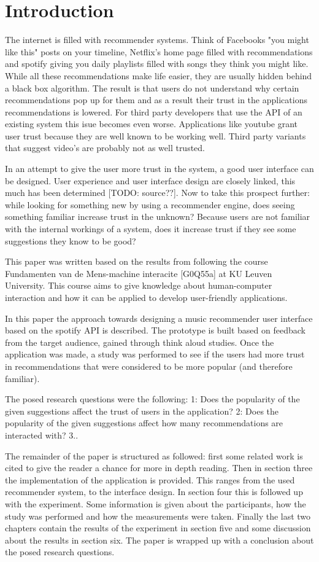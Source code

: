 \documentclass[sigconf,nonacm]{acmart}
\begin{document}
\section{Introduction}
The internet is filled with recommender systems. Think of Facebooks "you might like this" posts on your timeline, Netflix's home page filled with recommendations and spotify giving you daily playlists filled with songs they think you might like. While all these recommendations make life easier, they are usually hidden behind a black box algorithm. The result is that users do not understand why certain recommendations pop up for them and as a result their trust in the applications recommendations is lowered. For third party developers that use the API of an existing system this isue becomes even worse. Applications like youtube grant user trust because they are well known to be working well. Third party variants that suggest video's are probably not as well trusted.

In an attempt to give the user more trust in the system, a good user interface can be designed. User experience and user interface design are closely linked, this much has been determined [TODO: source??]. Now to take this prospect further: while looking for something new by using a recommender engine, does seeing something familiar increase trust in the unknown? Because users are not familiar with the internal workings of a system, does it increase trust if they see some suggestions they know to be good?

This paper was written based on the results from following the course Fundamenten van de Mens-machine interacite [G0Q55a] at KU Leuven University. This course aims to give knowledge about human-computer interaction and how it can be applied to develop user-friendly applications.

In this paper the approach towards designing a music recommender user interface based on the spotify API is described. The prototype is built based on feedback from the target audience, gained through think aloud studies. Once the application was made, a study was performed to see if the users had more trust in recommendations that were considered to be more popular (and therefore familiar).

The posed research questions were the following:
1: Does the popularity of the given suggestions affect the trust of users in the application?
2: Does the popularity of the given suggestions affect how many recommendations are interacted with?
3..

The remainder of the paper is structured as followed: first some related work is cited to give the reader a chance for more in depth reading. Then in section three the implementation of the application is provided. This ranges from the used recommender system, to the interface design. In section four this is followed up with the experiment. Some information is given about the participants, how the study was performed and how the measurements were taken. Finally the last two chapters contain the results of the experiment in section five and some discussion about the results in section six. The paper is wrapped up with a conclusion about the posed research questions.
\end{document}
